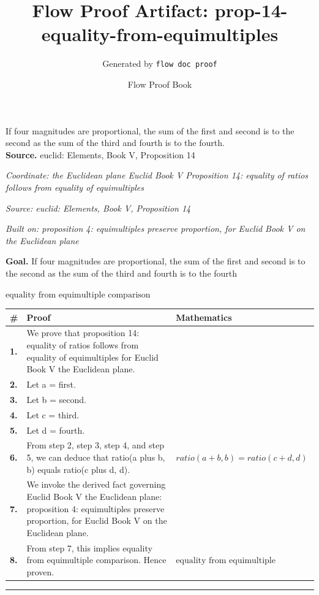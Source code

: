 \documentclass[11pt]{article}
\title{Flow Proof Artifact: prop-14-equality-from-equimultiples}
\author{Generated by \texttt{flow doc proof}}
\date{Flow Proof Book}
\theoremstyle{definition}
\begin{document}
\maketitle
If four magnitudes are proportional, the sum of the first and second is to the second as the sum of the third and fourth is to the fourth.\\[0.5em]
\textbf{Source.} euclid: Elements, Book V, Proposition 14\\[0.5em]
\bigskip
{}\par
\smallskip\noindent\textit{Coordinate: the Euclidean plane \cdot Euclid Book V \cdot Proposition 14: equality of ratios follows from equality of equimultiples}\par
\smallskip\noindent\textit{Source: euclid: Elements, Book V, Proposition 14}\par
\smallskip\noindent\textit{Built on: proposition 4: equimultiples preserve proportion, for Euclid Book V on the Euclidean plane}\par
\medskip
\noindent\textbf{Goal.} If four magnitudes are proportional, the sum of the first and second is to the second as the sum of the third and fourth is to the fourth\par
\noindent$\displaystyle \text{equality from equimultiple comparison}$\par
\medskip
\noindent
\begin{tabular}{@{} >{\raggedright\arraybackslash}p{} >{\raggedright\arraybackslash}p{} >{\raggedleft\arraybackslash}p{} @{}}
\textbf{\#} & \textbf{Proof} & \textbf{Mathematics} \\
\midrule
\textbf{1.} & We prove that proposition 14: equality of ratios follows from equality of equimultiples for Euclid Book V the Euclidean plane. & \\[0.45em]
\textbf{2.} & Let a = first. & \\[0.45em]
\textbf{3.} & Let b = second. & \\[0.45em]
\textbf{4.} & Let c = third. & \\[0.45em]
\textbf{5.} & Let d = fourth. & \\[0.45em]
\textbf{6.} & From step 2, step 3, step 4, and step 5, we can deduce that ratio(a plus b, b) equals ratio(c plus d, d). & $\displaystyle ratio(a + b, b) = ratio(c + d, d)$ \\[0.45em]
\textbf{7.} & We invoke the derived fact governing Euclid Book V the Euclidean plane: proposition 4: equimultiples preserve proportion, for Euclid Book V on the Euclidean plane. & \\[0.45em]
\textbf{8.} & From step 7, this implies equality from equimultiple comparison. Hence proven. & $\displaystyle \text{equality from equimultiple comparison}$ \\[0.45em]
\bottomrule
\end{tabular}
\label{thm:Geometry-Euclid Book V-proposition_14_equality_of_ratios_follows_from_equality_of_equimultiples}
\par\medskip\hrule
\end{document}
